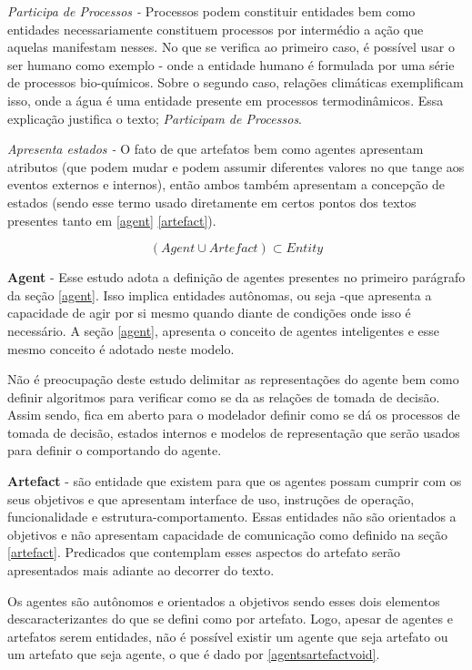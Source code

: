 \textit{Participa de Processos -} Processos podem constituir entidades bem como entidades necessariamente constituem processos por intermédio a ação que aquelas manifestam nesses. No que se verifica ao primeiro caso, é possível usar o ser humano como exemplo - onde
a entidade humano é formulada por uma série de processos bio-químicos. Sobre o segundo caso, relações climáticas exemplificam isso, onde a água é uma entidade presente em processos termodinâmicos. Essa explicação justifica o texto; \textit{Participam de Processos}.  

\textit{Apresenta estados -} O fato de que artefatos bem como agentes apresentam atributos (que podem mudar e podem assumir diferentes valores no que tange aos eventos externos e internos), então ambos também apresentam a concepção de estados (sendo esse termo usado diretamente em certos pontos dos textos presentes tanto em \ref{agent} \ref{artefact}). 


\begin{equation} \label{defineentity} 
( Agent \cup Artefact ) \subset Entity
\end{equation}

\textbf{Agent} - Esse estudo adota a definição de agentes presentes no primeiro parágrafo da seção \ref{agent}. Isso implica entidades autônomas, ou seja -que apresenta a capacidade de agir por si mesmo quando diante de condições onde isso é necessário. A seção \ref{agent}, apresenta o conceito de agentes inteligentes e esse mesmo conceito é adotado neste modelo. 

Não é preocupação deste estudo delimitar as representações do agente bem como definir algoritmos para verificar como se da as relações de tomada de decisão. Assim sendo, fica em aberto para o modelador definir como se dá os processos de tomada de decisão, estados internos e modelos de representação que serão usados para definir o comportando do agente. 

\textbf{Artefact} - são entidade que existem para que os agentes possam cumprir com os seus objetivos e que apresentam interface de uso, instruções de operação, funcionalidade e estrutura-comportamento. Essas entidades não são orientados a objetivos e 
não apresentam capacidade de comunicação como definido na seção \ref{artefact}. Predicados que contemplam esses aspectos do artefato serão apresentados mais adiante ao decorrer do texto. 

Os agentes são autônomos e orientados a objetivos sendo esses dois elementos descaracterizantes do que se defini como por artefato. Logo, apesar de agentes e artefatos serem entidades, não é possível existir um agente que seja artefato ou um artefato que seja agente, o que é dado por \ref{agentsartefactvoid}. 


